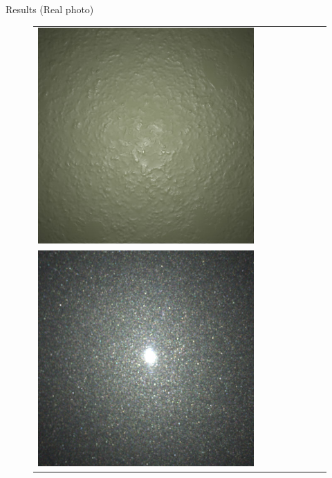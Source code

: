 \documentclass[final]{beamer}
\newlength{\twocolwid}
\newlength{\resultwidth}
\begin{document}
\begin{frame}[t]
\begin{columns}[t]
\begin{column}{\twocolwid}
\begin{block}{Results (Real photo)}
\begin{figure}[t]
\begin{tabular}{ccrclccc}
            		\includegraphics[width=\resultwidth]{images/real/plaster/bad1.jpg}
            		\\
            		\includegraphics[width=\resultwidth]{images/real/flake/target.jpg} &

\end{tabular}
\end{figure}
\end{block}
\end{column}
\end{columns}
\end{frame}
\end{document}
